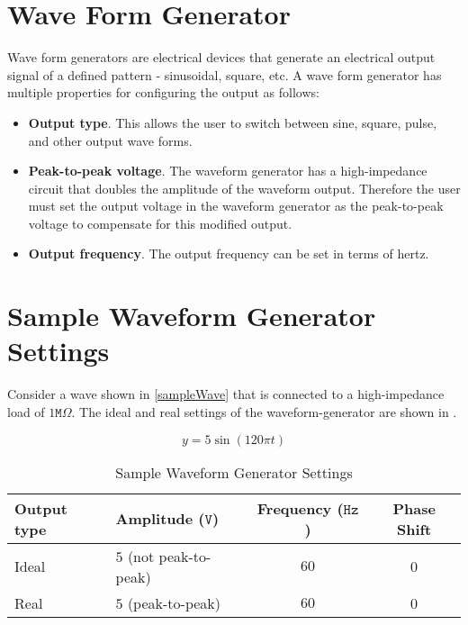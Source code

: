 \documentclass[main.tex]{subfile}
\begin{document}
\section{Wave Form Generator}
\label{sec:wave_form_generator}

Wave form generators are electrical devices that generate an electrical output
signal of a defined pattern - sinusoidal, square, etc. A wave form generator has
multiple properties for configuring the output as follows:

\begin{itemize}
	\item \textbf{Output type}. This allows the user to switch between sine, square, pulse,
		and other output wave forms.
	\item \textbf{Peak-to-peak voltage}. The waveform generator has a high-impedance circuit
		that doubles the amplitude of the waveform output. Therefore the user must set
		the output voltage in the waveform generator as the peak-to-peak voltage to
		compensate for this modified output.
	\item \textbf{Output frequency}. The output frequency can be set in terms of
		hertz.
\end{itemize}

\section{Sample Waveform Generator Settings}
\label{sec:sample_waveform_generator_settings}

Consider a wave shown in \eqref{sampleWave} that is connected to a high-impedance
load of $1\texttt{M}\Omega$. The ideal and real settings of the waveform-generator
are shown in .

\begin{equation}
	\label{eq:sampleWave}
	y = 5\sin({120{\pi}t}) 
\end{equation}

\begin{table}[h]
	\begin{center}
		\caption{Sample Waveform Generator Settings}
		\label{tab:genSettings}
		\begin{tabular}{llcc}
			\\ \toprule
			Output type & Amplitude ($\texttt{V}$) & Frequency ($\texttt{Hz}$) & Phase
			Shift
			\\ \midrule
			Ideal & $5$ (not peak-to-peak) & $60$ & 0
			\\ Real  & $5$ (peak-to-peak) & $60$ & 0
			\\ \bottomrule
		\end{tabular}
	\end{center}
\end{table}
\end{document}

